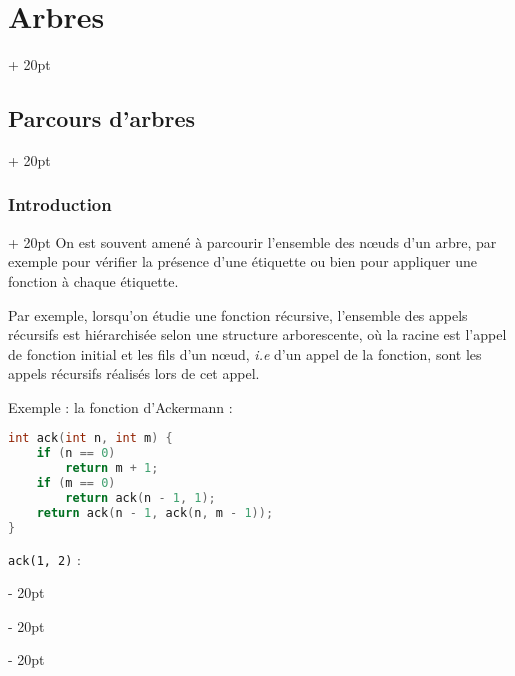 \documentclass[a4paper, 12pt, twoside]{article}
\newcommand{\ind}[1][20pt]{\advance\leftskip + #1}
\newcommand{\deind}[1][20pt]{\advance\leftskip - #1}
\newenvironment{indt}[2][20pt]{#2 \par \ind[#1]}{\par \deind} %
\begin{document}
\begin{indt}{\section{Arbres}}
        \vspace{12pt}
        
        \begin{indt}{\subsection{Parcours d'arbres}}
            \begin{indt}{\subsubsection{Introduction}}
                \label{1.2.1}
                On est souvent amené à parcourir l'ensemble des n\oe uds d'un arbre, par exemple pour vérifier la présence d'une étiquette ou bien pour appliquer une fonction à chaque étiquette.
                
                Par exemple, lorsqu'on étudie une fonction récursive, l'ensemble des appels récursifs est hiérarchisée selon une structure arborescente, où la racine est l'appel de fonction initial et les fils d'un n\oe ud, \textit{i.e} d'un appel de la fonction, sont les appels récursifs réalisés lors de cet appel.
                
                Exemple : la fonction d'Ackermann :
                
                \begin{lstlisting}[language=C, xleftmargin=80pt]
int ack(int n, int m) {
    if (n == 0)
        return m + 1;
    if (m == 0)
        return ack(n - 1, 1);
    return ack(n - 1, ack(n, m - 1));
}\end{lstlisting}
                
                \texttt{ack(1, 2)} :
                
                \begin{center}
                \end{center}
                

\end{indt}
\end{indt}
\end{indt}
\end{document}
